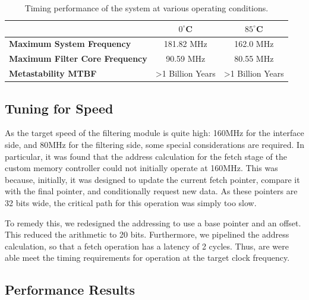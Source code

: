 \documentclass[]{article}
\begin{document}
\begin{table}[tbp]
	\caption{Timing performance of the system at various operating conditions.}
	\label{tab:fmax}
	\begin{center}
		\begin{tabular}{l|cc}
		\hline

		\hline
			 										& $0^\circ$C 					& $85^\circ$C 	\\
		\hline
			\textbf{Maximum System Frequency} 		& 181.82 MHz					& 162.0 MHz 	\\
		\hline
			\textbf{Maximum Filter Core Frequency}	& 90.59 MHz						& 80.55 MHz 	\\
		\hline
			\textbf{Metastability MTBF}				& \textgreater 1 Billion Years	& \textgreater 1 Billion Years \\
		\hline

		\hline
		\end{tabular}
	\end{center}
\end{table}



\subsection{Tuning for Speed} %
\label{sub:tuning_for_speed}

As the target speed of the filtering module is quite high: 160MHz for the interface side, and 80MHz for the filtering side, some special considerations are required.
In particular, it was found that the address calculation for the fetch stage of the custom memory controller could not initially operate at 160MHz.
This was because, initially, it was designed to update the current fetch pointer, compare it with the final pointer, and conditionally request new data. As these pointers are 32 bits wide, the critical path for this operation was simply too slow.

To remedy this, we redesigned the addressing to use a base pointer and an offset. This reduced the arithmetic to 20 bits. Furthermore, we pipelined the address calculation, so that a fetch operation has a latency of 2 cycles.
Thus, are were able meet the timing requirements for operation at the target clock frequency.



\subsection{Performance Results} %
\label{sub:performance_results}
\end{document}
